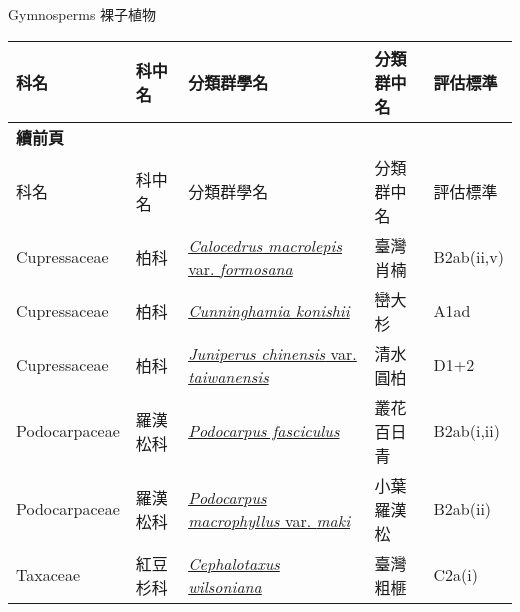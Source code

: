 \noindent\normalfont\selectfont Gymnosperms 裸子植物
\footnotesize\selectfont
        {\def\arraystretch{1.5}\tabcolsep=2pt
        \begin{longtable}{p{2.5cm}p{2.5cm}p{4.5cm}p{2.5cm}p{3cm}}
        \toprule
          科名 & 科中名 & 分類群學名 & 分類群中名 & 評估標準 \\
        \midrule 
        \endfirsthead

        {{\bfseries 續前頁 }} \\
        科名 & 科中名 & 分類群學名 & 分類群中名 & 評估標準 \\
        \midrule
        \endhead
                Cupressaceae & 柏科 & \href{http://www.theplantlist.org/tpl1.1/search?q=Calocedrus+macrolepis+var.+formosana}{\textit{Calocedrus macrolepis} var. \textit{formosana} } & 臺灣肖楠 & B2ab(ii,v) \index{Calocedrus@\textit{Calocedrus}!macrolepis@\textit{macrolepis}!var. formosana@var. \textit{formosana}}  \index{臺灣肖楠} \\
    Cupressaceae & 柏科 & \href{http://www.theplantlist.org/tpl1.1/search?q=Cunninghamia+konishii}{\textit{Cunninghamia konishii} } & 巒大杉 & A1ad \index{Cunninghamia@\textit{Cunninghamia}!konishii@\textit{konishii}}  \index{巒大杉} \\
    Cupressaceae & 柏科 & \href{http://www.theplantlist.org/tpl1.1/search?q=Juniperus+chinensis+var.+taiwanensis}{\textit{Juniperus chinensis} var. \textit{taiwanensis} } & 清水圓柏 & D1+2 \index{Juniperus@\textit{Juniperus}!chinensis@\textit{chinensis}!var. taiwanensis@var. \textit{taiwanensis}}  \index{清水圓柏} \\
    Podocarpaceae & 羅漢松科 & \href{http://www.theplantlist.org/tpl1.1/search?q=Podocarpus+fasciculus}{\textit{Podocarpus fasciculus} } & 叢花百日青 & B2ab(i,ii) \index{Podocarpus@\textit{Podocarpus}!fasciculus@\textit{fasciculus}}  \index{叢花百日青} \\
    Podocarpaceae & 羅漢松科 & \href{http://www.theplantlist.org/tpl1.1/search?q=Podocarpus+macrophyllus+var.+maki}{\textit{Podocarpus macrophyllus} var. \textit{maki} } & 小葉羅漢松 & B2ab(ii) \index{Podocarpus@\textit{Podocarpus}!macrophyllus@\textit{macrophyllus}!var. maki@var. \textit{maki}}  \index{小葉羅漢松} \\
    Taxaceae & 紅豆杉科 & \href{http://www.theplantlist.org/tpl1.1/search?q=Cephalotaxus+wilsoniana}{\textit{Cephalotaxus wilsoniana} } & 臺灣粗榧 & C2a(i) \index{Cephalotaxus@\textit{Cephalotaxus}!wilsoniana@\textit{wilsoniana}}  \index{臺灣粗榧} \\
    \bottomrule
        \end{longtable}
        }
    